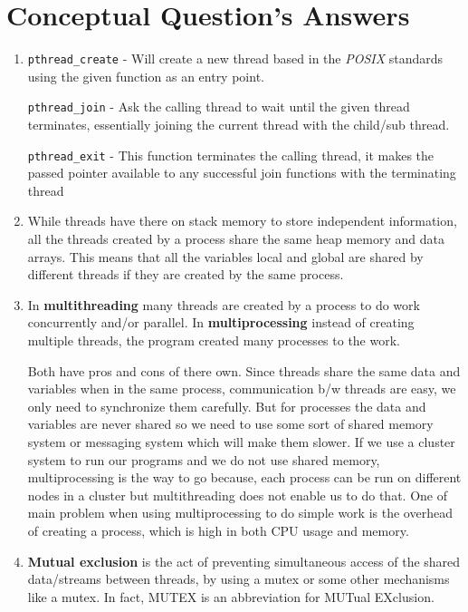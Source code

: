 \documentclass[12pt]{article}
\begin{document}
\section*{Conceptual Question's Answers}
\label{sec:org2822a7e}
\begin{enumerate}
\item \texttt{pthread\_create} - Will create a new thread based in the \emph{POSIX}
standards using the given function as an entry point.

\texttt{pthread\_join} - Ask the calling thread to wait until the given
thread terminates, essentially joining the current thread with the
child/sub thread.

\texttt{pthread\_exit} - This function terminates the calling thread, it
makes the passed pointer available to any successful join
functions with the terminating thread

\item While threads have there on stack memory to store independent
information, all the threads created by a process share the same
heap memory and data arrays. This means that all the variables
local and global are shared by different threads if they are
created by the same process.

\item In \textbf{multithreading} many threads are created by a process to do work
concurrently and/or parallel.  In \textbf{multiprocessing} instead of
creating multiple threads, the program created many processes to
the work.

Both have pros and cons of there own. Since threads share the same
data and variables when in the same process, communication b/w
threads are easy, we only need to synchronize them carefully. But
for processes the data and variables are never shared so we need
to use some sort of shared memory system or messaging system which
will make them slower. If we use a cluster system to run our
programs and we do not use shared memory, multiprocessing is the
way to go because, each process can be run on different nodes in a
cluster but multithreading does not enable us to do that. One of
main problem when using multiprocessing to do simple work is the
overhead of creating a process, which is high in both CPU usage
and memory.

\item \textbf{Mutual exclusion} is the act of preventing simultaneous access of
the shared data/streams between threads, by using a mutex or some
other mechanisms like a mutex. In fact, MUTEX is an abbreviation
for MUTual EXclusion.


\end{enumerate}
\end{document}
